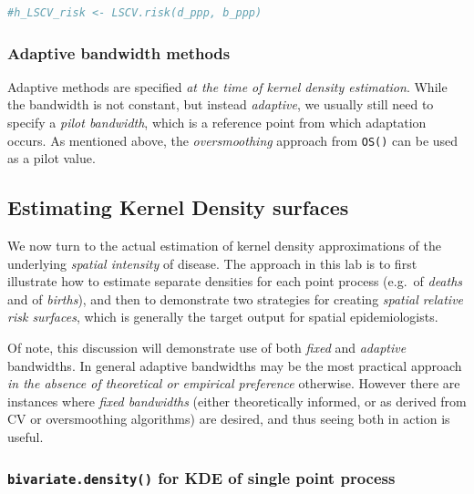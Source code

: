 \documentclass[
]{book}
\newcommand{\passthrough}[1]{#1}
\begin{document}
\begin{lstlisting}[language=R]
#h_LSCV_risk <- LSCV.risk(d_ppp, b_ppp)
\end{lstlisting}

\hypertarget{adaptive-bandwidth-methods}{%
\subsubsection{Adaptive bandwidth methods}\label{adaptive-bandwidth-methods}}

Adaptive methods are specified \emph{at the time of kernel density estimation}. While the bandwidth is not constant, but instead \emph{adaptive}, we usually still need to specify a \emph{pilot bandwidth}, which is a reference point from which adaptation occurs. As mentioned above, the \emph{oversmoothing} approach from \passthrough{\lstinline!OS()!} can be used as a pilot value.

\hypertarget{estimating-kernel-density-surfaces}{%
\subsection{Estimating Kernel Density surfaces}\label{estimating-kernel-density-surfaces}}

We now turn to the actual estimation of kernel density approximations of the underlying \emph{spatial intensity} of disease. The approach in this lab is to first illustrate how to estimate separate densities for each point process (e.g.~of \emph{deaths} and of \emph{births}), and then to demonstrate two strategies for creating \emph{spatial relative risk surfaces}, which is generally the target output for spatial epidemiologists.

Of note, this discussion will demonstrate use of both \emph{fixed} and \emph{adaptive} bandwidths. In general adaptive bandwidths may be the most practical approach \emph{in the absence of theoretical or empirical preference} otherwise. However there are instances where \emph{fixed bandwidths} (either theoretically informed, or as derived from CV or oversmoothing algorithms) are desired, and thus seeing both in action is useful.

\hypertarget{bivariate.density-for-kde-of-single-point-process}{%
\subsubsection{\texorpdfstring{\texttt{bivariate.density()} for KDE of single point process}{bivariate.density() for KDE of single point process}}\label{bivariate.density-for-kde-of-single-point-process}}
\end{document}
